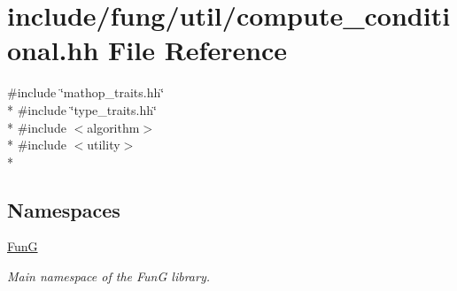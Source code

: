 \hypertarget{compute__conditional_8hh}{}\section{include/fung/util/compute\+\_\+conditional.hh File Reference}
\label{compute__conditional_8hh}
{\ttfamily \#include \char`\"{}mathop\+\_\+traits.\+hh\char`\"{}}\\*
{\ttfamily \#include \char`\"{}type\+\_\+traits.\+hh\char`\"{}}\\*
{\ttfamily \#include $<$algorithm$>$}\\*
{\ttfamily \#include $<$utility$>$}\\*
\subsection*{Namespaces}
\begin{DoxyCompactItemize}
\item 
 \hyperlink{namespaceFunG}{FunG}
\begin{DoxyCompactList}\small\item\em Main namespace of the FunG library. \end{DoxyCompactList}\end{DoxyCompactItemize}

